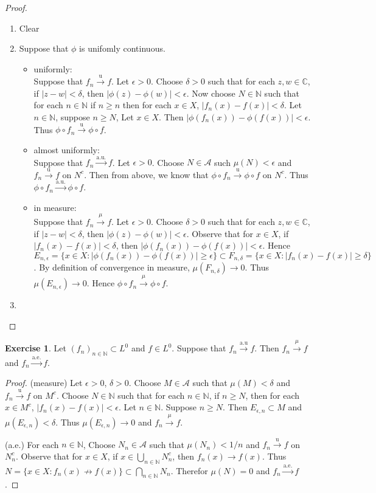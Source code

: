 \documentclass{book}
\theoremstyle{definition}
\newtheorem{ex}[definition]{Exercise}
\newcommand{\del}{\delta}
\newcommand{\ep}{\epsilon}
\newcommand{\C}{\mathbb{C}}
\newcommand{\N}{\mathbb{N}}
\newcommand{\MA}{\mathcal{A}}
\newcommand{\lex}[1]{\label{ex:#1}}
\DeclareMathOperator*{\0}{\mbf{0}}
\DeclareMathOperator*{\1}{\mbf{1}}
\newcommand{\convt}[1]{\xrightarrow{\text{#1}}}
\newcommand{\conv}[1]{\xrightarrow{#1}}
\begin{document}
	\begin{proof}\
		\begin{enumerate}
			\item Clear
			\item Suppose that $\phi$ is unifomly continuous. 
			\begin{itemize}
				\item uniformly: \\
				Suppose that $f_n \convt{u} f$. Let $\ep > 0$. Choose $\del >0$ such that for each $z,w \in \C$, if $|z-w|<\del$, then $|\phi(z) - \phi(w)| < \ep$. Now choose $N \in \N$ such that for each $n \in \N$ if $n \geq n$ then for each $x \in X$, $|f_n(x)-f(x)| < \del$. Let $n \in \N$, suppose $n \geq N$, Let $x \in X$. Then $|\phi(f_n(x)) - \phi(f(x))| < \ep$. Thus $\phi \circ f_n \convt{u} \phi \circ f$. 
				\item almost uniformly: \\
				Suppose that $f_n \convt{a.u.} f$. Let $\ep > 0$. Choose $N \in \MA$ such $\mu(N) < \ep$ and $f_n \convt{u} f$ on $N^c$. Then from above, we know that $\phi \circ f_n \convt{u} \phi \circ f$ on $N^c$. Thus $\phi \circ f_n \convt{a.u.} \phi \circ f$.
				\item in measure:\\ Suppose that $f_n \conv{\mu} f$. Let $\ep > 0$. Choose $\del >0$ such that for each $z,w \in \C$, if $|z-w|<\del$, then $|\phi(z) - \phi(w)| < \ep$. Observe that for $x \in X$, if $|f_n(x) - f(x)| < \del$, then $|\phi(f_n(x)) - \phi(f(x))| < \ep$. Hence $E_{n,\ep} = \{x \in X: |\phi(f_n(x)) - \phi(f(x))| \geq \ep\} \subset F_{n,\del} = \{x \in X: |f_n(x) - f(x)| \geq \del\}$. By definition of convergence in measure, $\mu(F_{n,\del}) \rightarrow 0$. Thus $\mu(E_{n,\ep}) \rightarrow 0$. Hence $\phi \circ f_n \conv{\mu} \phi \circ f$.
			\end{itemize}
			\item
		\end{enumerate}
	\end{proof}
	
	\begin{ex} \lex{35011} 
		Let $(f_n)_{n \in \N} \subset L^0$ and $f \in L^0$. Suppose that $f_n \convt{a.u} f$. Then $f_n \conv{\mu}f$ and $f_n \convt{a.e.}f$. 
	\end{ex}
	
	\begin{proof}
		(measure) Let $\ep>0$, $\del >0$. Choose $M \in \MA$ such that $\mu(M) < \del$ and $f_n \convt{u} f$ on $M^c$. Choose $N \in \N$ such that for each $n \in \N$, if $n \geq N$, then for each $x \in M^c$, $|f_n(x) - f(x)| < \ep$. Let $n \in \N$. Suppose $n \geq N$. Then $E_{\ep,n} \subset M$ and $\mu(E_{\ep,n}) < \del$. Thus $\mu(E_{\ep,n}) \rightarrow 0$ and $f_n \conv{\mu} f$.
		
		(a.e.) For each $n \in \N$, Choose $N_n \in \MA$ such that $\mu(N_n) < 1/n$ and $f_n \convt{u} f$ on $N_n^c$. Observe that for $x \in X$, if $x \in \bigcup_{n \in \N}N_n^c$, then $f_n(x) \rightarrow f(x)$. Thus $N = \{x \in X: f_n(x) \not \rightarrow f(x)\} \subset \bigcap_{n \in \N} N_n$. Therefor $\mu(N) = 0$ and $f_n \convt{a.e.} f$.
	\end{proof}
	
\end{document}
